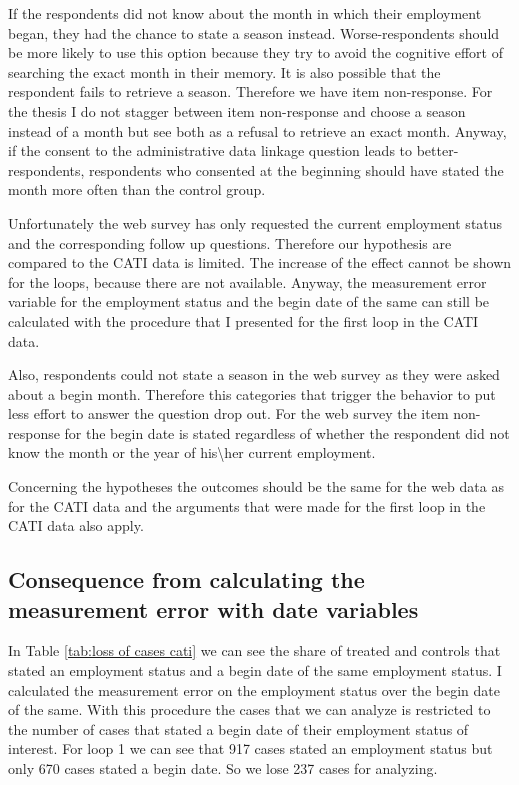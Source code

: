 If the respondents did not know about the month in which their employment began, they had the chance to state a season instead. Worse-respondents should be more likely to use this option because they try to avoid the cognitive effort of searching the exact month in their memory. It is also possible that the respondent fails to retrieve a season. Therefore we have item non-response. For the thesis I do not stagger between item non-response and choose a season instead of a month but see both as a refusal to retrieve an exact month. Anyway, if the consent to the administrative data linkage question leads to better-respondents, respondents who consented at the beginning should have stated the month more often than the control group.     

Unfortunately the web survey has only requested the current employment status and the corresponding follow up questions. Therefore our hypothesis are compared to the CATI data is limited. The increase of the effect cannot be shown for the loops, because there are not available. Anyway, the measurement error variable for the employment status and the begin date of the same can still be calculated with the procedure that I presented for the first loop in the CATI data. 

Also, respondents could not state a season in the web survey as they were asked about a begin month. Therefore this categories that trigger the behavior to put less effort to answer the question drop out. For the web survey the item non-response for the begin date is stated regardless of whether the respondent did not know the month or the year of his\textbackslash her current employment.

Concerning the hypotheses the outcomes should be the same for the web data as for the CATI data and the arguments that were made for the first loop in the CATI data also apply.     
 
\subsection{Consequence from calculating the measurement error with date variables}

In Table \ref{tab:loss of cases cati} we can see the share of treated and controls that stated an employment status and a begin date of the same employment status. I calculated the measurement error on the employment status over the begin date of the same. With this procedure the cases that we can analyze is restricted to the number of cases that stated a begin date of their employment status of interest. For loop 1 we can see that 917 cases stated an employment status but only 670 cases stated a begin date. So we lose  237 cases for analyzing. 

